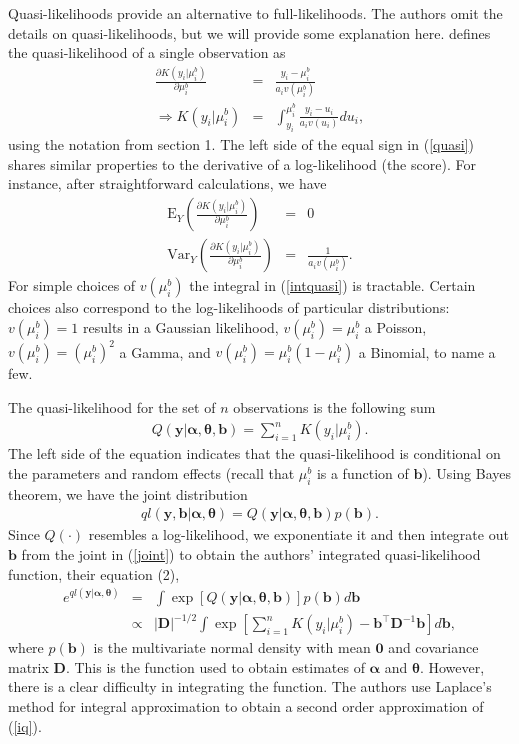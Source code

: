 \documentclass[12pt]{article}
\newcommand{\m}[1]{\mathbf{\bm{#1}}}
\newcommand{\E}{\mathrm{E}}
\newcommand{\Var}{\mathrm{Var}}
\begin{document}
Quasi-likelihoods provide an alternative to full-likelihoods. The authors omit the details on quasi-likelihoods, but we will provide some explanation here. \cite{wedderburn:1974} defines the quasi-likelihood of a single observation as
\begin{eqnarray}
\frac{\partial K(y_i| \mu_i^b)}{\partial \mu_i^b} &=& \frac{y_i-\mu_i^b}{a_i v(\mu_i^b)} \label{quasi} \\
\Longrightarrow K(y_i|\mu_i^b)&=&\int_{y_i}^{\mu_i^b}\frac{y_i-u_i}{a_i v(u_i)}du_i, \label{intquasi}
\end{eqnarray}
using the notation from section 1. The left side of the equal sign in (\ref{quasi}) shares similar properties to the derivative of a log-likelihood (the score). For instance, after straightforward calculations, we have
\begin{eqnarray}
\E_Y\left(\frac{\partial K(y_i| \mu_i^b)}{\partial \mu_i^b}\right) &=& 0 \\
\Var_Y\left(\frac{\partial K(y_i| \mu_i^b)}{\partial \mu_i^b}\right)&=& \frac{1}{a_i v(\mu_i^b)}.
\end{eqnarray}
For simple choices of $v(\mu_i^b)$ the integral in (\ref{intquasi}) is tractable. Certain choices also correspond to the log-likelihoods of particular distributions: $v(\mu_i^b)=1$ results in a Gaussian likelihood, $v(\mu_i^b)=\mu_i^b$ a Poisson, $v(\mu_i^b)=(\mu_i^b)^2$ a Gamma, and $v(\mu_i^b)=\mu_i^b(1-\mu_i^b)$ a Binomial, to name a few.

The quasi-likelihood for the set of $n$ observations is the following sum
\begin{eqnarray}
Q(\m{y}|\m{\alpha}, \m{\theta}, \m{b}) = \sum_{i=1}^nK(y_i|\mu_i^b).
\end{eqnarray}
The left side of the equation indicates that the quasi-likelihood is conditional on the parameters and random effects (recall that $\mu_i^b$ is a function of $\m{b}$). Using Bayes theorem, we have the joint distribution
\begin{eqnarray}
ql(\m{y},\m{b}|\m{\alpha},\m{\theta}) = Q(\m{y}|\m{\alpha},\m{\theta},\m{b})p(\m{b}). \label{joint}
\end{eqnarray}
Since $Q(\cdot)$ resembles a log-likelihood, we exponentiate it and then integrate out $\m{b}$ from the joint in (\ref{joint}) to obtain the authors' integrated quasi-likelihood function, their equation (2),
\begin{eqnarray}
e^{ql(\m{y}|\m{\alpha},\m{\theta})} &=& \int\exp\left[Q(\m{y}|\m{\alpha},\m{\theta},\m{b})\right]p(\m{b})d\m{b} \\
&\propto& |\m{D}|^{-1/2}\int\exp\left[\sum_{i=1}^nK(y_i|\mu_i^b)-\m{b}^\top\m{D}^{-1}\m{b}\right]d\m{b}, \label{iq}
\end{eqnarray}
where $p(\m{b})$ is the multivariate normal density with mean $\m{0}$ and covariance matrix $\m{D}$. This is the function used to obtain estimates of $\m{\alpha}$ and $\m{\theta}$. However, there is a clear difficulty in integrating the function. The authors use Laplace's method for integral approximation to obtain a second order approximation of (\ref{iq}).
\end{document}
